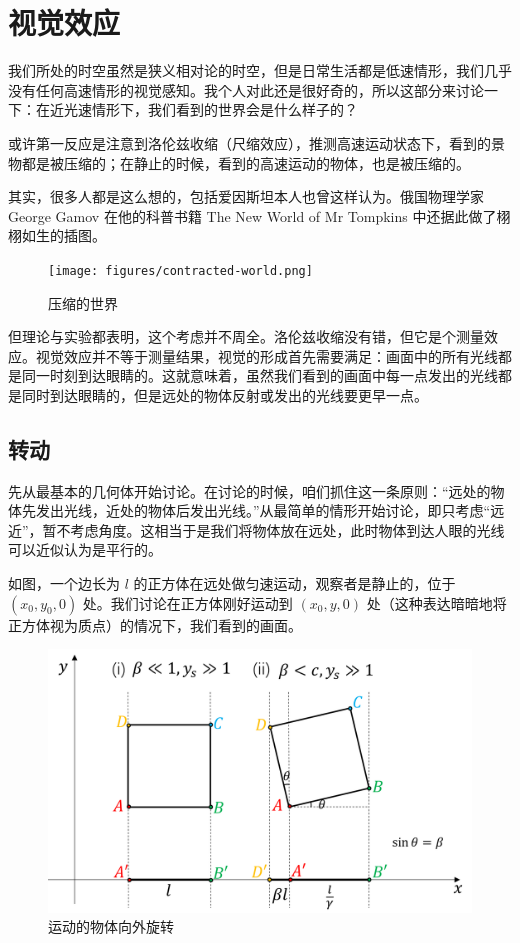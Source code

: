 \documentclass[12pt, a4paper, oneside]{ctexbook}
\begin{document}
\chapter{视觉效应}

我们所处的时空虽然是狭义相对论的时空，但是日常生活都是低速情形，我们几乎没有任何高速情形的视觉感知。我个人对此还是很好奇的，所以这部分来讨论一下：在近光速情形下，我们看到的世界会是什么样子的？

\par   或许第一反应是注意到洛伦兹收缩（尺缩效应），推测高速运动状态下，看到的景物都是被压缩的；在静止的时候，看到的高速运动的物体，也是被压缩的。

\par   其实，很多人都是这么想的，包括爱因斯坦本人也曾这样认为。俄国物理学家 George Gamov 在他的科普书籍 The New World of Mr Tompkins 中还据此做了栩栩如生的插图。

\begin{figure}[H]
	\centering
	\texttt{[image: figures/contracted-world.png]}
	\caption{压缩的世界}
\end{figure}

\par   但理论与实验都表明，这个考虑并不周全。洛伦兹收缩没有错，但它是个测量效应。视觉效应并不等于测量结果，视觉的形成首先需要满足：画面中的所有光线都是同一时刻到达眼睛的。这就意味着，虽然我们看到的画面中每一点发出的光线都是同时到达眼睛的，但是远处的物体反射或发出的光线要更早一点。

\section{转动}

先从最基本的几何体开始讨论。在讨论的时候，咱们抓住这一条原则：“远处的物体先发出光线，近处的物体后发出光线。”从最简单的情形开始讨论，即只考虑“远近”，暂不考虑角度。这相当于是我们将物体放在远处，此时物体到达人眼的光线可以近似认为是平行的。

\par   如图，一个边长为 $l$ 的正方体在远处做匀速运动，观察者是静止的，位于 $(x_{0},y_{0},0)$ 处。我们讨论在正方体刚好运动到 $(x_{0},y,0)$ 处（这种表达暗暗地将正方体视为质点）的情况下，我们看到的画面。

\begin{figure}[H]
	\centering
	\includegraphics[scale=0.8]{figures/Terrell-rotation-square.png}
	\caption{运动的物体向外旋转}
\end{figure}
\end{document}

